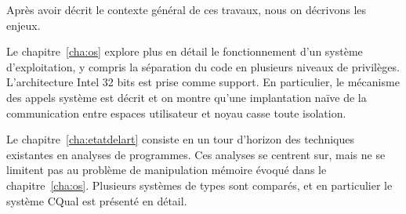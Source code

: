 \begin{headingpage}

Après avoir décrit le contexte général de ces travaux, nous on décrivons les
enjeux.

Le chapitre~\ref{cha:os} explore plus en détail le fonctionnement d'un système
d'exploitation, y compris la séparation du code en plusieurs niveaux de
privilèges. L'architecture Intel 32 bits est prise comme support. En
particulier, le mécanisme des appels système est décrit et on montre qu'une
implantation naïve de la communication entre espaces utilisateur et noyau casse
toute isolation.

Le chapitre~\ref{cha:etatdelart} consiste en un tour d'horizon des techniques
existantes en analyses de programmes. Ces analyses se centrent sur, mais ne se
limitent pas au problème de manipulation mémoire évoqué dans le
chapitre~\ref{cha:os}. Plusieurs systèmes de types sont comparés, et en
particulier le système CQual est présenté en détail.

\end{headingpage}
